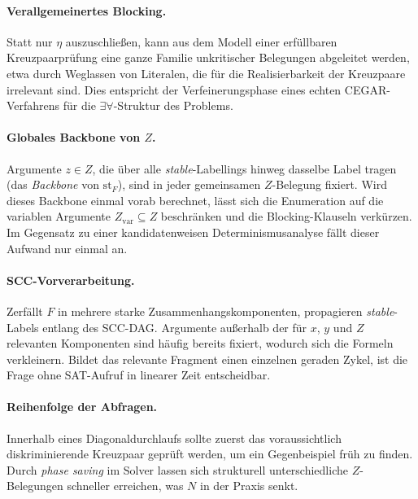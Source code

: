 \paragraph{Verallgemeinertes Blocking.}
Statt nur \(\eta\) auszuschließen, kann aus dem Modell einer erfüllbaren
Kreuzpaarprüfung eine ganze Familie unkritischer Belegungen abgeleitet werden,
etwa durch Weglassen von Literalen, die für die Realisierbarkeit der
Kreuzpaare irrelevant sind. Dies entspricht der Verfeinerungsphase eines
echten CEGAR-Verfahrens für die \(\exists\forall\)-Struktur des Problems.

\paragraph{Globales Backbone von \(Z\).}
Argumente \(z\in Z\), die über alle \textit{stable}-Labellings hinweg dasselbe
Label tragen (das \emph{Backbone} von \(\mathrm{st}_F\)), sind in jeder
gemeinsamen \(Z\)-Belegung fixiert. Wird dieses Backbone einmal vorab
berechnet, lässt sich die Enumeration auf die variablen Argumente
\(Z_{\mathrm{var}}\subseteq Z\) beschränken und die Blocking-Klauseln
verkürzen. Im Gegensatz zu einer kandidatenweisen Determinismusanalyse fällt
dieser Aufwand nur einmal an.

\paragraph{SCC-Vorverarbeitung.}
Zerfällt \(F\) in mehrere starke Zusammenhangskomponenten, propagieren
\textit{stable}-Labels entlang des SCC-DAG. Argumente außerhalb der für \(x\),
\(y\) und \(Z\) relevanten Komponenten sind häufig bereits fixiert, wodurch
sich die Formeln verkleinern. Bildet das relevante Fragment einen einzelnen
geraden Zykel, ist die Frage ohne SAT-Aufruf in linearer Zeit entscheidbar.

\paragraph{Reihenfolge der Abfragen.}
Innerhalb eines Diagonaldurchlaufs sollte zuerst das voraussichtlich
diskriminierende Kreuzpaar geprüft werden, um ein Gegenbeispiel früh zu
finden. Durch \emph{phase saving} im Solver lassen sich strukturell
unterschiedliche \(Z\)-Belegungen schneller erreichen, was \(N\) in der Praxis
senkt.